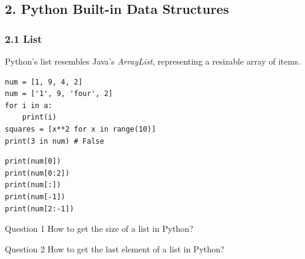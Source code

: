 \documentclass[aspectratio=169, 14pt]{beamer}
\begin{document}
{
    \begin{frame}
        \section{\textcolor{darkmidnightblue}{2. Python Built-in Data Structures}}
    \end{frame}
}

\begin{frame}[fragile]
    \frametitle{2.1 List}
    Python's \alert{list} resembles Java's \emph{ArrayList}, representing a resizable array of items.

    \begin{verbatim}
num = [1, 9, 4, 2]        
num = ['1', 9, 'four', 2]
for i in a:
    print(i)
squares = [x**2 for x in range(10)]
print(3 in num) # False
    \end{verbatim}    
\end{frame}

\begin{frame}[fragile]
    \begin{verbatim}
print(num[0])
print(num[0:2])
print(num[:])
print(num[-1])
print(num[2:-1])    
    \end{verbatim}

\begin{exampleblock}{Question 1}
    How to get the size of a list in Python?
\end{exampleblock}

\begin{exampleblock}{Question 2}
How to get the last element of a list in Python?
\end{exampleblock}

\end{frame}
\end{document}
